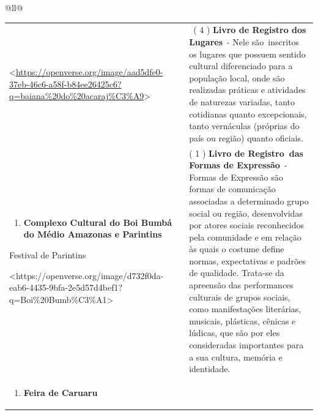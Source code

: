 \begin{itemize}
\begin{itemize}
\begin{escolha}[]{@{}ll@{}}
{{\begin{longtable}[]{@{}lll@{}}
\begin{minipage}[t]{0.32\columnwidth}
\textless{}\url{https://openverse.org/image/aad5dfe0-37eb-46c6-a58f-b84ee26425c6?q=baiana\%20do\%20acaraj\%C3\%A9}\textgreater{}\strut
\end{minipage} & \begin{minipage}[t]{0.32\columnwidth}\raggedright\strut
\strut
\end{minipage} & \begin{minipage}[t]{0.32\columnwidth}\raggedright\strut
~( 4 ) \textbf{Livro de Registro dos Lugares}~- Nele são~inscritos os
lugares que possuem sentido cultural diferenciado para a população
local, onde são realizadas práticas e atividades de naturezas variadas,
tanto cotidianas quanto excepcionais, tanto vernáculas (próprias do país
ou região) quanto oficiais.\strut
\end{minipage}\tabularnewline
\begin{minipage}[t]{0.32\columnwidth}\raggedright\strut
\begin{enumerate}
\def\labelenumi{\arabic{enumi}.}
\item
  \textbf{Complexo Cultural do Boi Bumbá do Médio Amazonas e Parintins}
\end{enumerate}

Festival de Parintins

\textless{}https://openverse.org/image/d732f0da-eab6-4435-9bfa-2e5d57d4bef1?q=Boi\%20Bumb\%C3\%A1\textgreater{}\strut
\end{minipage} & \begin{minipage}[t]{0.32\columnwidth}\raggedright\strut
\strut
\end{minipage} & \begin{minipage}[t]{0.32\columnwidth}\raggedright\strut
( 1 ) \textbf{Livro de Registro~das Formas de Expressão}~- Formas de
Expressão são formas de comunicação associadas a determinado grupo
social ou região, desenvolvidas por atores sociais reconhecidos pela
comunidade e em relação às quais o costume define normas, expectativas e
padrões de qualidade. Trata-se da apreensão das performances culturais
de grupos sociais, como manifestações literárias, musicais, plásticas,
cênicas e lúdicas, que são por eles consideradas importantes para a sua
cultura, memória e identidade.\strut
\end{minipage}\tabularnewline
\begin{minipage}[t]{0.32\columnwidth}\raggedright\strut
\begin{enumerate}
\def\labelenumi{\arabic{enumi}.}
\item
  \textbf{Feira de Caruaru}
\end{enumerate}


\end{minipage}
\end{longtable}}}
\end{escolha}
\end{itemize}
\end{itemize}
